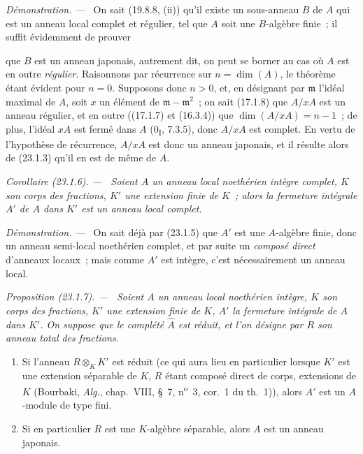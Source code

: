 \documentclass[10pt,oneside]{book}
\makeatletter
\newcommand{\setmanualcurrentlabel}[1]{\def\@currentlabel{#1}}
\newcommand{\oldpage}[2][]{%
  \setcounter{footnote}{0}%
  \marginpar{\scriptsize\textbf{#1}~|~#2}\ignorespaces}
\newenvironment{proposition}[1][]{%
  \setmanualcurrentlabel{#1}\par\medskip\noindent\itshape Proposition (#1). ---\ }{\par}
\newenvironment{corollary}[1][]{%
  \setmanualcurrentlabel{#1}\par\medskip\noindent\itshape Corollaire (#1). ---\ }{\par}
\newenvironment{proof}{%
  \par\medskip\noindent\textit{Démonstration. ---\ }}{\par}
\makeatother
\begin{document}
\begin{proof}
On sait (19.8.8, (ii)) qu'il existe un sous-anneau $B$ de $A$ qui est un
anneau local complet et régulier, tel que $A$ soit une $B$-algèbre finie~; il
suffit évidemment de prouver

\oldpage[0\textsubscript{IV-1}]{216}

que $B$ est un anneau japonais, autrement dit, on peut se borner au cas où
$A$ est en outre \emph{régulier}. Raisonnons par récurrence sur
$n=\dim(A)$, le théorème étant évident pour $n=0$. Supposons donc $n>0$, et,
en désignant par $\mathfrak m$ l'idéal maximal de $A$, soit $x$ un élément de
$\mathfrak m-\mathfrak m^2$~; on sait (17.1.8) que $A/xA$ est un anneau
régulier, et en outre ((17.1.7) et (16.3.4)) que
$\dim(A/xA)=n-1$~; de plus, l'idéal $xA$ est fermé dans $A$
(0\textsubscript{I}, 7.3.5), donc $A/xA$ est complet. En vertu de l'hypothèse
de récurrence, $A/xA$ est donc un anneau japonais, et il résulte alors de
(23.1.3) qu'il en est de même de $A$.
\end{proof}

\begin{corollary}[23.1.6]
\label{0.23.1.6-fr}
Soient $A$ un anneau local noethérien intègre complet, $K$ son corps des
fractions, $K'$ une extension finie de $K$~; alors la fermeture intégrale
$A'$ de $A$ dans $K'$ est un anneau local complet.
\end{corollary}

\begin{proof}
On sait déjà par (23.1.5) que $A'$ est une $A$-algèbre finie, donc un anneau
semi-local noethérien complet, et par suite un \emph{composé direct}
d'anneaux locaux~; mais comme $A'$ est intègre, c'est nécessairement un
anneau local.
\end{proof}

\begin{proposition}[23.1.7]
\label{0.23.1.7-fr}
Soient $A$ un anneau local noethérien intègre, $K$ son corps des fractions,
$K'$ une extension finie de $K$, $A'$ la fermeture intégrale de $A$ dans
$K'$. On suppose que le complété $\widehat A$ est réduit, et l'on désigne par
$R$ son anneau total des fractions.
\begin{enumerate}
  \item[(i)] Si l'anneau $R\otimes_KK'$ est réduit (ce qui aura lieu en
  particulier lorsque $K'$ est une extension séparable de $K$, $R$ étant
  composé direct de corps, extensions de $K$ (Bourbaki, \emph{Alg.},
  chap.~VIII, §~7, n\textsuperscript{o}~3, cor.~1 du th.~1)), alors $A'$ est
  un $A$-module de type fini.
  \item[(ii)] Si en particulier $R$ est une $K$-algèbre séparable, alors $A$
  est un anneau japonais.
\end{enumerate}
\end{proposition}
\end{document}
